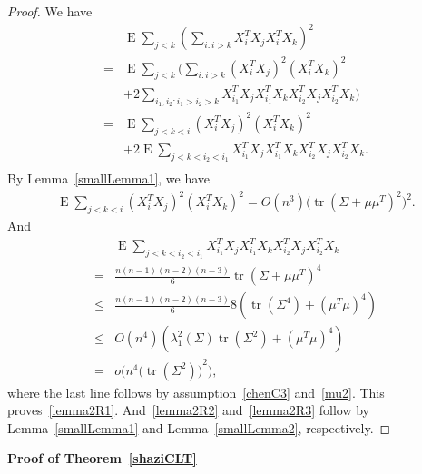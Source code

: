 \documentclass[review]{elsarticle}
\DeclareMathOperator{\mytr}{tr}
\DeclareMathOperator{\myE}{E}
\theoremstyle{plain}
\theoremstyle{definition}
\theoremstyle{remark}
\begin{document}
\begin{proof}
    We have
    \begin{equation*}
    \begin{aligned}
        &\myE\sum_{j<k}{(\sum_{i:i>k}X_i^T X_j X_i^T X_k)}^2\\
        =&
        \myE\sum_{j<k}\Big(\sum_{i:i>k}(X_i^T X_j)^2 (X_i^T X_k)^2\\
        &+2\sum_{i_1,i_2:i_1>i_2>k}X_{i_1}^T X_j X_{i_1}^T X_k X_{i_2}^T X_j X_{i_2}^T X_k\Big)\\
        =&
        \myE\sum_{j<k<i}(X_i^T X_j)^2 (X_i^T X_k)^2\\
        &+2\myE\sum_{j<k<i_2<i_1}X_{i_1}^T X_j X_{i_1}^T X_k X_{i_2}^T X_j X_{i_2}^T X_k.\\
    \end{aligned}
    \end{equation*}
    By Lemma~\ref{smallLemma1}, we have
    \begin{equation*}
    \begin{aligned}
        \myE\sum_{j<k<i}(X_i^T X_j)^2 (X_i^T X_k)^2    =O(n^3)\big(\mytr (\Sigma+\mu\mu^T)^2\big)^2.
    \end{aligned}
    \end{equation*}
And
    \begin{equation*}
    \begin{aligned}
        &\myE\sum_{j<k<i_2<i_1}X_{i_1}^T X_j X_{i_1}^T X_k X_{i_2}^T X_j X_{i_2}^T X_k\\
        =&\frac{n(n-1)(n-2)(n-3)}{6}\mytr {(\Sigma+\mu\mu^T)}^4\\
        \leq& \frac{n(n-1)(n-2)(n-3)}{6}8(\mytr (\Sigma^4)+(\mu^T \mu)^4)\\
        \leq& O(n^4)(\lambda_{1}^2(\Sigma)\mytr (\Sigma^2)+(\mu^T \mu)^4)\\
        =&
        o\Big(n^4{\big(\mytr (\Sigma^2)\big)}^2\Big),
    \end{aligned}
    \end{equation*}
    where the last line follows by assumption~\eqref{chenC3} and~\eqref{mu2}.
    This proves~\eqref{lemma2R1}. And~\eqref{lemma2R2} and~\eqref{lemma2R3} follow by Lemma~\ref{smallLemma1} and Lemma~\ref{smallLemma2}, respectively.

\end{proof}

\textbf{Proof of Theorem~\ref{shaziCLT}}
\end{document}
